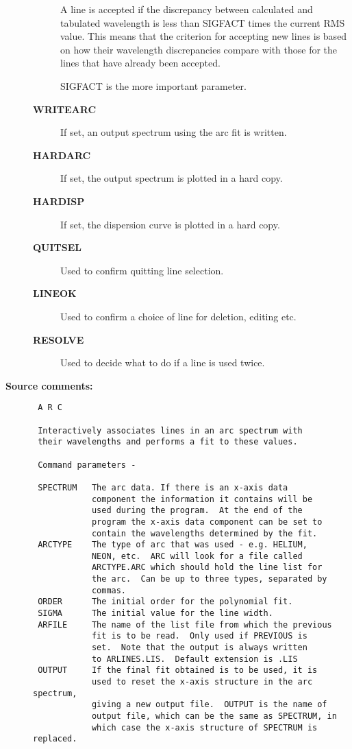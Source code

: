 \begin{description}
\begin{description}
 A line is accepted if the discrepancy between calculated and
 tabulated wavelength is less than SIGFACT times the current RMS
 value.  This means that the criterion for accepting new lines
 is based on how their wavelength discrepancies compare with those for
 the lines that have already been accepted.

 SIGFACT is the more important parameter.
\item [{\bf WRITEARC}]
 If set, an output spectrum using the arc fit is written.
\item [{\bf HARDARC}]
 If set, the output spectrum is plotted in a hard copy.
\item [{\bf HARDISP}]
 If set, the dispersion curve is plotted in a hard copy.
\item [{\bf QUITSEL}]
 Used to confirm quitting line selection.
\item [{\bf LINEOK}]
 Used to confirm a choice of line for deletion, editing etc.
\item [{\bf RESOLVE}]
 Used to decide what to do if a line is used twice.
\end{description}

\item [{\bf Source comments:}]
\begin{verbatim}
 A R C

 Interactively associates lines in an arc spectrum with
 their wavelengths and performs a fit to these values.

 Command parameters -

 SPECTRUM   The arc data. If there is an x-axis data
            component the information it contains will be
            used during the program.  At the end of the
            program the x-axis data component can be set to
            contain the wavelengths determined by the fit.
 ARCTYPE    The type of arc that was used - e.g. HELIUM,
            NEON, etc.  ARC will look for a file called
            ARCTYPE.ARC which should hold the line list for
            the arc.  Can be up to three types, separated by
            commas.
 ORDER      The initial order for the polynomial fit.
 SIGMA      The initial value for the line width.
 ARFILE     The name of the list file from which the previous
            fit is to be read.  Only used if PREVIOUS is
            set.  Note that the output is always written
            to ARLINES.LIS.  Default extension is .LIS
 OUTPUT     If the final fit obtained is to be used, it is
            used to reset the x-axis structure in the arc spectrum,
            giving a new output file.  OUTPUT is the name of
            output file, which can be the same as SPECTRUM, in
            which case the x-axis structure of SPECTRUM is replaced.


\end{verbatim}
\end{description}
